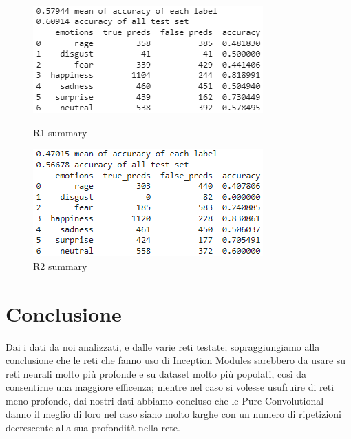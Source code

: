 \documentclass[target=mst]{thud}
\begin{document}
\begin{figure}[h!]
    \centering
    \begin{minipage}[b]{0.48\textwidth}
      \centering
      \includegraphics[scale=0.85]{R1_summary.png}
      \caption{R1 summary}
      \label{fig:R1_summary}
    \end{minipage}
    \begin{minipage}[b]{0.48\textwidth}
      \centering
      \includegraphics[scale=0.85]{R2_summary.png}
      \caption{R2 summary}
      \label{fig:R2_summary}
    \end{minipage}
\end{figure}


\chapter{Conclusione}
Dai i dati da noi analizzati, e dalle varie reti testate; sopraggiungiamo alla conclusione che le reti che fanno uso di Inception Modules sarebbero da usare su reti neurali molto più profonde e su dataset molto più popolati, così da consentirne una maggiore efficenza; mentre nel caso si volesse usufruire di reti meno profonde, dai nostri dati abbiamo concluso che le Pure Convolutional danno il meglio di loro nel caso siano molto larghe con un numero di ripetizioni decrescente alla sua profondità nella rete.

\backmatter

\appendix
\backmatter
\end{document}
